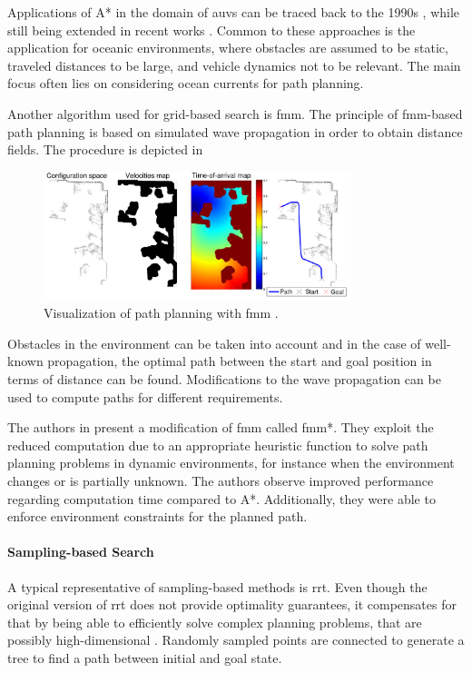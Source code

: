 Applications of A* in the domain of \acp{auv} can be traced back to the 1990s \cite{Carroll92}, while still being extended in recent works \cite{zhang20}. Common to these approaches is the application for oceanic environments, where obstacles are assumed to be static, traveled distances to be large, and vehicle dynamics not to be relevant. The main focus often lies on considering ocean currents for path planning.

Another algorithm used for grid-based search is \ac{fmm}. The principle of \acs{fmm}-based path planning is based on simulated wave propagation in order to obtain distance fields. The procedure is depicted in 
\begin{figure}
    \centering
    \includegraphics[width=0.8\textwidth]{images/02/fmm}
    \caption{Visualization of path planning with \ac{fmm} \cite{Gomez15}.}
    \label{fig:fmm}
\end{figure}
Obstacles in the environment can be taken into account and in the case of well-known propagation, the optimal path between the start and goal position in terms of distance can be found. Modifications to the wave propagation can be used to compute paths for different requirements.

The authors in \cite{Petres09} present a modification of \ac{fmm} called \acs{fmm}*. They exploit the reduced computation due to an appropriate heuristic function to solve path planning problems in dynamic environments, for instance when the environment changes or is partially unknown. The authors observe improved performance regarding computation time compared to A*. Additionally, they were able to enforce environment constraints for the planned path.

\paragraph{Sampling-based Search}

A typical representative of sampling-based methods is \ac{rrt}. Even though the original version of \ac{rrt} does not provide optimality guarantees, it compensates for that by being able to efficiently solve complex planning problems, that are possibly high-dimensional \cite{Devaurs16}. Randomly sampled points are connected to generate a tree to find a path between initial and goal state.

